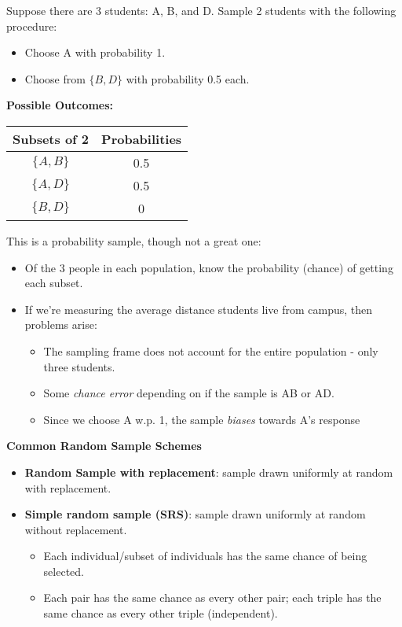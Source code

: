 \begin{example}[]{Suppose there are 3 students: A, B, and D. Sample 2 students with the following procedure:
\begin{itemize}
\item Choose A with probability 1.
\item Choose from $\{B,D\}$ with probability 0.5 each.
\end{itemize}
\textbf{Possible Outcomes:}
\begin{center}
\begin{tabular}{@{}cc@{}}
\toprule
    Subsets of 2 & Probabilities \\
\midrule
    $\{A,B\}$ & 0.5 \\
    $\{A,D\}$ & 0.5 \\
    $\{B,D\}$ & 0 \\
\bottomrule
\end{tabular}
\end{center}
This is a probability sample, though not a great one:
\begin{itemize}
\item Of the 3 people in each population, know the probability (chance) of getting each subset.
\item If we're measuring the average distance students live from campus, then problems arise:
\begin{itemize}
\item The sampling frame does not account for the entire population - only three students.
\item Some \textit{chance error} depending on if the sample is AB or AD.
\item Since we choose A w.p. 1, the sample \textit{biases} towards A's response
\end{itemize}
\end{itemize}
}
\end{example}
\textbf{Common Random Sample Schemes}
\begin{itemize}
\item \textbf{Random Sample with replacement}: sample drawn uniformly at random with replacement.
\item \textbf{Simple random sample (SRS)}: sample drawn uniformly at random without replacement.
\begin{itemize}
\item Each individual/subset of individuals has the same chance of being selected.
\item Each pair has the same chance as every other pair; each triple has the same chance as every other triple (independent).
\end{itemize}
\end{itemize}
